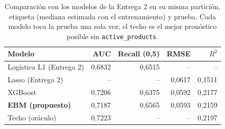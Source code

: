 \begin{table}[htbp]
\caption{Comparación con los modelos de la Entrega 2 en su misma partición, etiqueta (mediana estimada con el entrenamiento) y prueba. Cada modelo toca la prueba una sola vez; el techo es el mejor pronóstico posible sin \texttt{active\_products}.}\label{tab:entrega2}
\scriptsize\setlength{\tabcolsep}{2pt}
\begin{tabular}{lrrrr}
\toprule
\textbf{Modelo} & \textbf{AUC} & \textbf{Recall (0,5)} & \textbf{RMSE} & \textbf{$R^2$} \\
\midrule
Logística L1 (Entrega 2) & 0,6832 & 0,6515 & -- & -- \\
Lasso (Entrega 2) & -- & -- & 0,0617 & 0,1511 \\
XGBoost & 0,7206 & 0,6375 & 0,0592 & 0,2177 \\
\textbf{EBM (propuesto)} & 0,7187 & 0,6565 & 0,0593 & 0,2159 \\
Techo (oráculo) & 0,7223 & -- & -- & 0,2197 \\
\bottomrule
\end{tabular}
\end{table}
